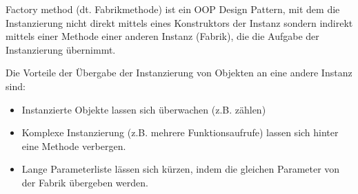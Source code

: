 Factory method (dt. Fabrikmethode) ist ein OOP Design Pattern, mit dem die Instanzierung nicht direkt mittels eines Konstruktors der Instanz 
sondern indirekt mittels einer Methode einer anderen Instanz (Fabrik), die die Aufgabe der Instanzierung übernimmt.

Die Vorteile der Übergabe der Instanzierung von Objekten an eine andere Instanz sind:
\begin{itemize}
    \item Instanzierte Objekte lassen sich überwachen (z.B. zählen)
    \item Komplexe Instanzierung (z.B. mehrere Funktionsaufrufe) lassen sich hinter eine Methode verbergen.
    \item Lange Parameterliste lässen sich kürzen, indem die gleichen Parameter von der Fabrik übergeben werden.
\end{itemize}